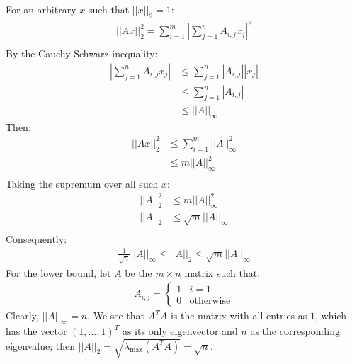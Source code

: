 \documentclass{article}
\begin{document}
For an arbitrary $x$ such that $||x||_2 = 1$:
\begin{align*}
    ||Ax||_2^2 = \sum_{i=1}^m \left|\sum_{j=1}^n A_{i,j}x_j\right|^2 \\
\end{align*}
By the Cauchy-Schwarz inequality:
\begin{align*}
    \left|\sum_{j=1}^n A_{i,j}x_j\right| & \leq \sum_{j=1}^n |A_{i,j}||x_j| \\
    & \leq \sum_{j=1}^n |A_{i,j}| \\
    & \leq ||A||_\infty
\end{align*}
Then:
\begin{align*}
    ||Ax||_2^2 & \leq \sum_{i=1}^m ||A||_\infty^2 \\
    & \leq m ||A||_\infty^2 \\
\end{align*}
Taking the supremum over all such $x$:
\begin{align*}
    ||A||_2^2 & \leq m ||A||_\infty^2 \\
    ||A||_2 & \leq \sqrt{m} ||A||_\infty \\
\end{align*}
Consequently:
\begin{align*}
    \frac{1}{\sqrt{n}}||A||_\infty \leq ||A||_2 \leq \sqrt{m} ||A||_\infty
\end{align*}
For the lower bound, let $A$ be the $m \times n$ matrix such that:
\begin{align*}
    A_{i,j} = \begin{cases}
    1 & i = 1 \\
    0 & \text{otherwise}
    \end{cases}
\end{align*}
Clearly, $||A||_\infty = n$. We see that $A^T A$ is the matrix with all entries as $1$, which has the vector ${(1, \ldots, 1)}^T$ as its only eigenvector and $n$ as the corresponding eigenvalue; then $||A||_2 = \sqrt{\lambda_{\max}(A^T A)} = \sqrt{n}$.
\end{document}
